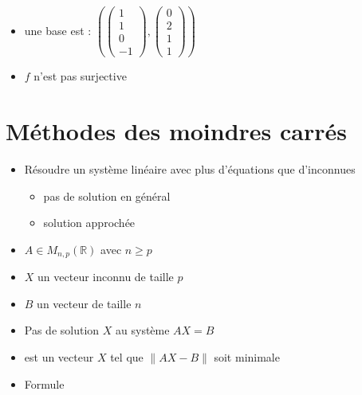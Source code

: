 \begin{frame}[fragile]
\begin{enumerate}
\begin{itemize}
    \item une base est :
  $\left( 
  \left(\begin{smallmatrix}1\\1\\0\\ -1\end{smallmatrix}\right),
  \left(\begin{smallmatrix}0\\2\\ 1\\ 1\end{smallmatrix}\right)
  \right)$
   \pause
    \item $f$ n'est pas surjective
 
  
  \end{itemize}
 
\end{enumerate}


\end{frame}


\section{Méthodes des moindres carrés}

\begin{frame}



\pause
\begin{itemize}
  \item Résoudre un système linéaire avec plus d'équations que d'inconnues
  \pause
  \begin{itemize}
    \item pas de solution en général
    \pause
    \item solution approchée
    
  \end{itemize}
   \pause 
  \item $A \in M_{n,p}(\mathbb R)$ avec $n \ge p$
  \pause
  \item $X$ un vecteur inconnu de taille $p$
  \pause
  \item $B$ un vecteur de taille $n$
  \pause
  \item Pas de solution $X$ au système $AX=B$
  \pause
  \item {} est un vecteur $X$ 
tel que $\| AX -B \|$ soit minimale
\pause
  \item Formule 
\end{itemize}

\end{frame}


